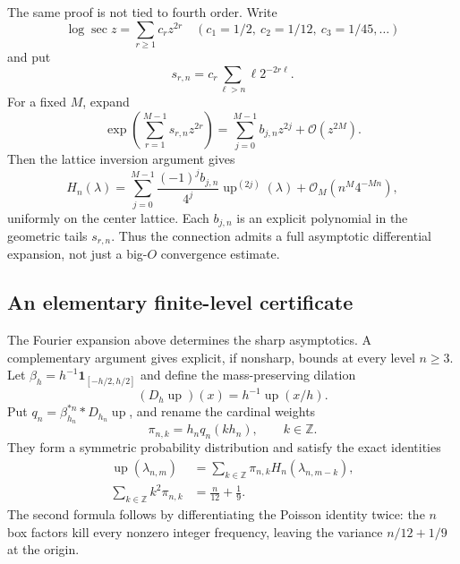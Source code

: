 \documentclass[11pt,oneside]{article}
\theoremstyle{definition}
\theoremstyle{remark}
\newcommand{\Z}{\mathbb Z}
\newcommand{\Up}{\operatorname{up}}
\newcommand{\bigO}{\mathcal O}
\begin{document}
The same proof is not tied to fourth order.  Write
\begin{equation}
 \log\sec z=\sum_{r\ge1}c_rz^{2r}
 \quad(c_1=1/2,\ c_2=1/12,\ c_3=1/45,\ldots)              \label{tmrates:eq:logsec-full}
\end{equation}
and put
\begin{equation}
 s_{r,n}=c_r\sum_{\ell>n}\ell2^{-2r\ell}.                 \label{tmrates:eq:srn}
\end{equation}
For a fixed $M$, expand
\begin{equation}
 \exp\left(\sum_{r=1}^{M-1}s_{r,n}z^{2r}\right)
 =\sum_{j=0}^{M-1}b_{j,n}z^{2j}+\bigO(z^{2M}).             \label{tmrates:eq:bjn}
\end{equation}
Then the lattice inversion argument gives
\begin{equation}
 H_n(\lambda)
 =\sum_{j=0}^{M-1}\frac{(-1)^j b_{j,n}}{4^j}
    \Up^{(2j)}(\lambda)
 +\bigO_M\!\left(n^M4^{-Mn}\right),                      \label{tmrates:eq:all-orders}
\end{equation}
uniformly on the center lattice.  Each $b_{j,n}$ is an explicit polynomial in the geometric
tails $s_{r,n}$.  Thus the connection admits a full asymptotic differential expansion, not
just a big-$O$ convergence estimate.

\subsection{An elementary finite-level certificate}
\label{tmrates:sec:effective-certificate}

The Fourier expansion above determines the sharp asymptotics.  A complementary argument
gives explicit, if nonsharp, bounds at every level $n\ge3$.  Let
$\beta_h=h^{-1}\mathbf 1_{[-h/2,h/2]}$ and define the mass-preserving dilation
\[
 (D_h\Up)(x)=h^{-1}\Up(x/h).
\]
Put \(q_n=\beta_{h_n}^{*n}*D_{h_n}\Up\), and rename the cardinal weights
\begin{equation}
 \pi_{n,k}=h_nq_n(kh_n),\qquad k\in\Z.
 \label{tmrates:eq:cardinal-weights}
\end{equation}
They form a symmetric probability distribution and satisfy the exact identities
\begin{align}
 \Up(\lambda_{n,m})
 &=\sum_{k\in\Z}\pi_{n,k}H_n(\lambda_{n,m-k}),
 \label{tmrates:eq:cardinal-average}\\
 \sum_{k\in\Z}k^2\pi_{n,k}&=\frac n{12}+\frac19.
 \label{tmrates:eq:cardinal-second-moment}
\end{align}
The second formula follows by differentiating the Poisson identity twice: the
$n$ box factors kill every nonzero integer frequency, leaving the variance
$n/12+1/9$ at the origin.
\end{document}
